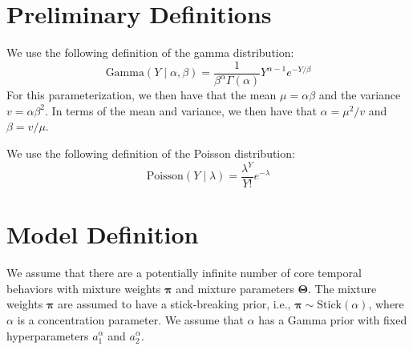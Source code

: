 \section{Preliminary Definitions}
We use the following definition of the gamma distribution:
\[
\textrm{Gamma}(Y \; | \; \alpha, \beta) = \frac{1}{\beta^{\alpha} \Gamma(\alpha)} Y^{\alpha-1}e^{-Y/\beta}
\]
For this parameterization, we then have that the mean $\mu = \alpha \beta$ and the variance $v = \alpha \beta^{2}$.  In terms of the mean and variance, we then have that $\alpha = \mu^{2}/v$ and $\beta = v/\mu$.

We use the following definition of the Poisson distribution:
\[
\textrm{Poisson}(Y \; | \; \lambda) = \frac{\lambda^{Y}}{Y!} e^{-\lambda}
\]

\section{Model Definition} \label{sec:Model Definition}
We assume that there are a potentially infinite number of core temporal behaviors with mixture weights $\bm{\pi}$ and mixture parameters $\bm{\Theta}$.  The mixture weights $\bm{\pi}$ are assumed to have a stick-breaking prior, i.e.,  $\bm{\pi} \sim \textrm{Stick}(\alpha)$, where $\alpha$ is a concentration parameter.  We assume that $\alpha$ has a Gamma prior with fixed hyperparameters  $a^{\alpha}_1$ and $a^{\alpha}_2$.

